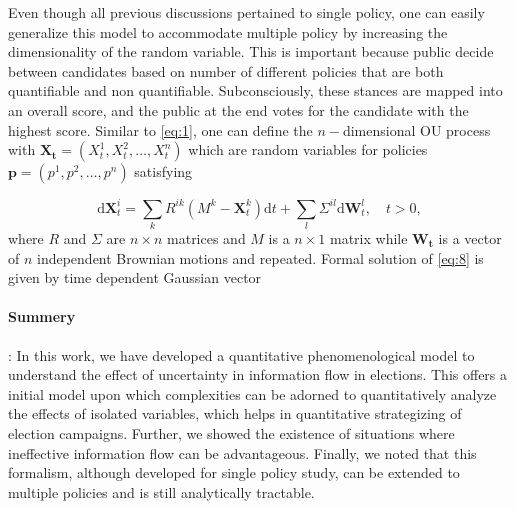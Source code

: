 \documentclass[aps,prl,twocolumn,showpacs,final]{revtex4-1}
\begin{document}

Even though all previous discussions pertained to single policy, one can easily generalize this model to accommodate multiple policy by increasing the dimensionality of the random variable. This is important because public decide between candidates based on number of different policies that are both quantifiable and non quantifiable. Subconsciously, these stances are mapped into an overall score, and the public at the end votes for the candidate with the highest score. Similar to \eqref{eq:1}, one can define the $n-$dimensional OU process with $\mathbf{X_t}=(X^1_t,X^2_t,\ldots,X^n_t)$ which are random variables for policies $\mathbf{p}=(p^1,p^2,\ldots,p^n)$ satisfying

\begin{equation}
\mathrm{d} \mathbf{X}^i_{t}=\sum_k R^{ik}\left(M^k-\mathbf{X}^k_{t}\right) \mathrm{d} t+\sum_l \Sigma^{il} \mathrm{d} \mathbf{W}^l_{t}, \quad t>0 \label{eq:8},
\end{equation}
where $R$ and $\Sigma$ are $n\times n$ matrices and $M$ is a $n \times 1$ matrix while $\mathbf{W_{t}}$ is a vector of $n$ independent Brownian motions and repeated. Formal solution of \eqref{eq:8} is given by time dependent Gaussian vector\cite{vatiwutipong2019alternative}

\paragraph*{Summery}: In this work, we have developed a quantitative phenomenological model to understand the effect of uncertainty in information flow in elections. This offers a initial model upon which complexities can be adorned to quantitatively analyze the effects of isolated variables, which helps in quantitative strategizing of election campaigns. Further, we showed the existence of situations where ineffective information flow can be advantageous. Finally, we noted that this formalism, although developed for single policy study, can be extended to multiple policies and is still analytically tractable.

\end{document}

